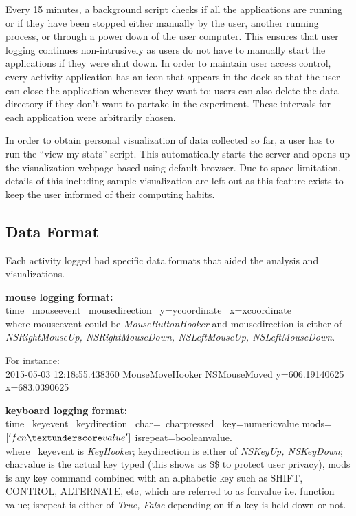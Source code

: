 \documentclass{article}
\begin{document}
Every 15 minutes, a background script checks if all the applications are running or if they have been stopped either manually by the user, another running process, or through a power down of the user computer. This ensures that user logging continues non-intrusively as users do not have to manually start the applications if they were shut down. In order to maintain user access control, every activity application has an icon that appears in the dock so that the user can close the application whenever they want to; users can also delete the data directory if they don't want to partake in the experiment. These intervals for each application were arbitrarily chosen. 

In order to obtain personal visualization of data collected so far, a user has to run the ``view-my-stats'' script. This automatically starts the server and opens up the visualization webpage based using default browser. Due to space limitation, details of this including sample visualization are left out as this feature exists to keep the user informed of their computing habits. 

\subsection{Data Format}
Each activity logged had specific data formats that aided the analysis and visualizations. 

\textbf{mouse logging format:}\\
	time 
	\textpipe \  mouse\textunderscore event  
	\textpipe  \  mouse\textunderscore direction  
	\textpipe \  y=y\textunderscore coordinate \   x=x\textunderscore coordinate\\   
	    \newline
	where mouse\textunderscore event could be \textit{MouseButtonHooker} and
	mouse\textunderscore direction is either of \textit{NSRightMouseUp, NSRightMouseDown, NSLeftMouseUp, NSLeftMouseDown}.
	
For instance: \\
2015-05-03 12:18:55.438360 
MouseMoveHooker 
NSMouseMoved 
y=606.19140625 x=683.0390625

\textbf{keyboard logging format:}\\
time
	\textpipe \  key\textunderscore event  
	\textpipe  \  key\textunderscore direction
	\textpipe \ char=\  char\textunderscore pressed \ 
    key=numeric\textunderscore value
     mods=$['fcn\textunderscore value']$
    is\textunderscore repeat=boolean\textunderscore value.\\
    \newline
    where \  key\textunderscore event is \textit{KeyHooker};  key\textunderscore direction is either of \textit{NSKeyUp, NSKeyDown}; char\textunderscore value is the actual key typed (this shows as \$\$ to protect user privacy), mods is any key command combined with an alphabetic key such as SHIFT, CONTROL, ALTERNATE, etc, which are referred to as fcn\textunderscore value i.e. function value;  is\textunderscore repeat is either of \textit{True, False} depending on if a key is held down or not.\\
    
\end{document}
